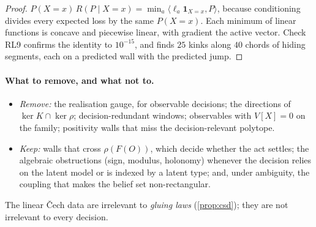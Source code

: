 \begin{proof}
$P(X{=}x)\,R(P\mid X{=}x)=\min_a\langle\ell_a\mathbf 1_{X=x},P\rangle$, because conditioning divides every expected loss by the same
$P(X{=}x)$. Each minimum of linear functions is concave and piecewise linear, with gradient the active vector. Check RL9 confirms the
identity to $10^{-15}$, and finds $25$ kinks along $40$ chords of hiding segments, each on a predicted wall with the predicted jump.
\end{proof}

\paragraph{What to remove, and what not to.}
\begin{itemize}
\item \emph{Remove:} the realisation gauge, for observable decisions; the directions of $\ker K\cap\ker\rho$; decision-redundant windows;
  observables with $V[X]=0$ on the family; positivity walls that miss the decision-relevant polytope.
\item \emph{Keep:} walls that cross $\rho(F(O))$, which decide whether the act settles; the algebraic obstructions (sign, modulus,
  holonomy) whenever the decision relies on the latent model or is indexed by a latent type; and, under ambiguity, the coupling that makes
  the belief set non-rectangular.
\end{itemize}
The linear Čech data are irrelevant to \emph{gluing laws} (\cref{prop:csd}); they are not irrelevant to every decision.
